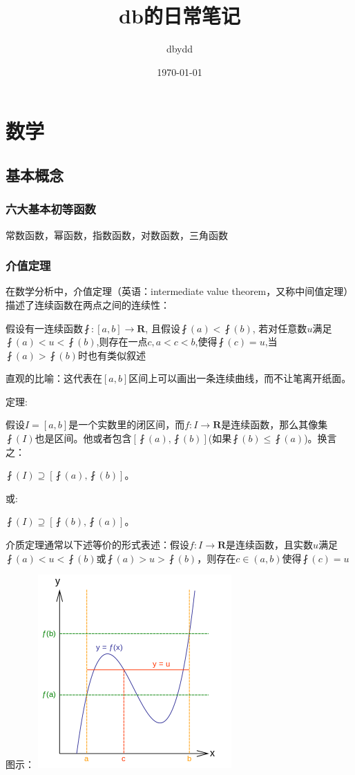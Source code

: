 \documentclass[UTF8]{ctexbook}
\title{db的日常笔记}
\date{\today}
\author{dbydd}
\begin{document}
\setcounter{page}{1}
\chapter{数学}{
\section{基本概念}{
\subsection{六大基本初等函数}{
  常数函数，幂函数，指数函数，对数函数，三角函数
}

\subsection{介值定理}{
在数学分析中，介值定理（英语：intermediate value theorem，又称中间值定理）描述了连续函数在两点之间的连续性：

假设有一连续函数$\fint:[a,b]\rightarrow \mathbf{R}$, 且假设$\fint(a)<\fint(b)$, 若对任意数$u$满足$\fint(a)<u<\fint(b)$,则存在一点$c,a<c<b$,使得$\fint(c) = u$,当$\fint(a)>\fint(b)时也有类似叙述$

直观的比喻：这代表在$[a,b]$区间上可以画出一条连续曲线，而不让笔离开纸面。
\newline

定理:

假设$I = [a,b]$是一个实数里的闭区间，而$f:I\rightarrow\mathbf{R}$是连续函数，那么其像集$\fint(I)$也是区间。他或者包含$[\fint(a),\fint(b)]$(如果$\fint(b)\leq\fint(a)$)。换言之：

$\fint(I)\supseteq[\fint(a),\fint(b)]$。

或:

$\fint(I)\supseteq[\fint(b), \fint(a)]$。

介质定理通常以下述等价的形式表述：假设$f:I\rightarrow\mathbf{R}$是连续函数，且实数$u$满足$\fint(a)<u<\fint(b)$或$\fint(a)>u>\fint(b)$，则存在$c\in(a,b)$使得$\fint(c) = u$

图示：
\includegraphics{resources/Intermediatevaluetheorem.png}
}

}}
\end{document}
